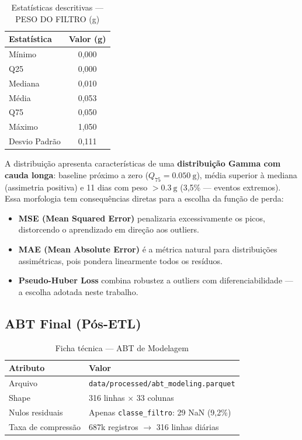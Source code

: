 \documentclass[12pt, a4paper]{article}
\newcommand{\feature}[1]{\texttt{#1}}
\newcommand{\arquivo}[1]{\texttt{#1}}
\begin{document}
\begin{table}[H]
\centering
\caption{Estatísticas descritivas — PESO DO FILTRO (g)}
\label{tab:target_stats}
\begin{tabular}{@{}lS[table-format=1.3]@{}}
\toprule
\textbf{Estatística} & \textbf{Valor (g)} \\
\midrule
Mínimo      & 0,000 \\
Q25         & 0,000 \\
Mediana     & 0,010 \\
Média       & 0,053 \\
Q75         & 0,050 \\
Máximo      & 1,050 \\
Desvio Padrão & 0,111 \\
\bottomrule
\end{tabular}
\end{table}

A distribuição apresenta características de uma \textbf{distribuição Gamma
com cauda longa}: baseline próximo a zero ($Q_{75} = \SI{0,050}{\gram}$),
média superior à mediana (assimetria positiva) e 11 dias com peso $>
\SI{0,3}{\gram}$ (3,5\% — eventos extremos). Essa morfologia tem
consequências diretas para a escolha da função de perda:

\begin{itemize}
    \item \textbf{MSE (Mean Squared Error)} penalizaria excessivamente os
          picos, distorcendo o aprendizado em direção aos outliers.
    \item \textbf{MAE (Mean Absolute Error)} é a métrica natural para
          distribuições assimétricas, pois pondera linearmente todos os
          resíduos.
    \item \textbf{Pseudo-Huber Loss} combina robustez a outliers com
          diferenciabilidade — a escolha adotada neste trabalho.
\end{itemize}

\subsection{ABT Final (Pós-ETL)}
\label{subsec:abt}

\begin{table}[H]
\centering
\caption{Ficha técnica — ABT de Modelagem}
\label{tab:abt_ficha}
\begin{tabular}{@{}ll@{}}
\toprule
\textbf{Atributo}       & \textbf{Valor} \\
\midrule
Arquivo                  & \arquivo{data/processed/abt\_modeling.parquet} \\
Shape                    & 316 linhas $\times$ 33 colunas \\
Nulos residuais          & Apenas \feature{classe\_filtro}: 29 NaN (9,2\%) \\
Taxa de compressão       & 687k registros $\to$ 316 linhas diárias \\
\bottomrule
\end{tabular}
\end{table}
\end{document}
